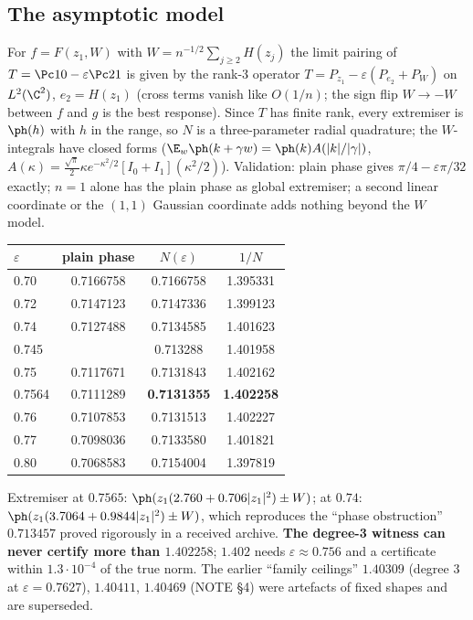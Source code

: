 \subsection{The asymptotic model}
For $f=F(z_1,W)$ with $W=n^{-1/2}\sum_{j\ge2}H(z_j)$ the limit pairing of $T=\Pc10-\varepsilon\Pc21$ is given by the rank-3 operator
$T=P_{z_1}-\varepsilon(P_{e_2}+P_W)$ on $L^2(\C^2)$, $e_2=H(z_1)$ (cross terms vanish like $O(1/n)$; the sign flip $W\to-W$ between $f$ and $g$ is the
best response). Since $T$ has finite rank, every extremiser is $\ph(h)$ with $h$ in the range, so $N$ is a three-parameter radial quadrature; the
$W$-integrals have closed forms ($\E_w\ph(k+\gamma w)=\ph(k)A(|k|/|\gamma|)$, $A(\kappa)=\frac{\sqrt\pi}2\kappa e^{-\kappa^2/2}[I_0+I_1](\kappa^2/2)$).
Validation: plain phase gives $\pi/4-\varepsilon\pi/32$ exactly; $n=1$ alone has the plain phase as global extremiser; a second linear coordinate
or the $(1,1)$ Gaussian coordinate adds nothing beyond the $W$ model.
\begin{center}
\begin{tabular}{lccc}\toprule
$\varepsilon$ & plain phase & $N(\varepsilon)$ & $1/N$\\\midrule
0.70 & 0.7166758 & 0.7166758 & 1.395331\\
0.72 & 0.7147123 & 0.7147336 & 1.399123\\
0.74 & 0.7127488 & 0.7134585 & 1.401623\\
0.745 & & 0.713288 & 1.401958\\
0.75 & 0.7117671 & 0.7131843 & 1.402162\\
0.7564 & 0.7111289 & \textbf{0.7131355} & \textbf{1.402258}\\
0.76 & 0.7107853 & 0.7131513 & 1.402227\\
0.77 & 0.7098036 & 0.7133580 & 1.401821\\
0.80 & 0.7068583 & 0.7154004 & 1.397819\\\bottomrule
\end{tabular}
\end{center}
Extremiser at $0.7565$: $\ph(z_1(2.760+0.706|z_1|^2)\pm W)$; at $0.74$: $\ph(z_1(3.7064+0.9844|z_1|^2)\pm W)$, which reproduces the ``phase
obstruction'' $0.713457$ proved rigorously in a received archive. \textbf{The degree-3 witness can never certify more than $1.402258$}; $1.402$
needs $\varepsilon\approx0.756$ and a certificate within $1.3\cdot10^{-4}$ of the true norm. The earlier ``family ceilings'' $1.40309$ (degree 3 at
$\varepsilon=0.7627$), $1.40411$, $1.40469$ (NOTE \S4) were artefacts of fixed shapes and are superseded.

